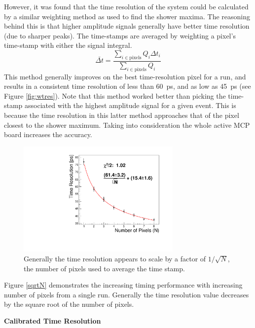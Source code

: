 \documentclass[twocolumn]{article}
\begin{document}
However, it was found that the time resolution of the system could be calculated by a similar weighting method as used to find the shower maxima. The reasoning behind this is that higher amplitude signals generally have better time resolution (due to sharper peaks). The time-stamps are averaged by weighting a pixel's time-stamp with either the signal integral.
\[\bar{\Delta t} =
\frac{\sum_{i\in\text{pixels}} Q_i \Delta t_i}
{\sum_{i\in\text{pixels}} Q_i}
\]
This method generally improves on the best time-resolution pixel for a run, and results in a consistent time resolution of less than \SI{60}{\pico\second}, and as low as \SI{45}{\pico\second} (see Figure \ref{fig:wtres}). Note that this method worked better than picking the time-stamp associated with the highest amplitude signal for a given event. This is because the time resolution in this latter method approaches that of the pixel closest to the shower maximum. Taking into consideration the whole active MCP board increases the accuracy.

\begin{figure}[htbp]
	\centering
	\includegraphics[width=8cm]{Images/sqrtN/t1065_run_38_Dt_IWP.pdf}
	\caption{\small Generally the time resolution appears to scale by a factor of $1/\sqrt{N}$, the number of pixels used to average the time stamp.}
	\label{fig:sqrtN}
\end{figure}

Figure \ref{sqrtN} demonstrates the increasing timing performance with increasing number of pixels from a single run. Generally the time resolution value decreases by the square root of the number of pixels.


\title{\large}{\textbf{Calibrated Time Resolution}}
\end{document}
